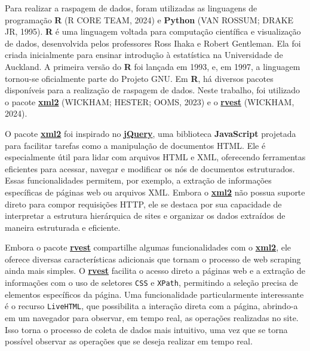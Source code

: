 \documentclass[
  12pt,
  a4paper,
]{scrreprt}
\begin{document}
\vspace{12pt}

Para realizar a raspagem de dados, foram utilizadas as linguagens de
programação \textbf{R} (R CORE TEAM, 2024) e \textbf{Python} (VAN
ROSSUM; DRAKE JR, 1995). \textbf{R} é uma linguagem voltada para
computação científica e visualização de dados, desenvolvida pelos
professores Ross Ihaka e Robert Gentleman. Ela foi criada inicialmente
para ensinar introdução à estatística na Universidade de Auckland. A
primeira versão do \textbf{R} foi lançada em 1993, e, em 1997, a
linguagem tornou-se oficialmente parte do Projeto GNU. Em \textbf{R}, há
diversos pacotes disponíveis para a realização de raspagem de dados.
Neste trabalho, foi utilizado o pacote
\href{https://xml2.r-lib.org/}{\textbf{xml2}} (WICKHAM; HESTER; OOMS,
2023) e o \href{https://rvest.tidyverse.org/}{\textbf{rvest}} (WICKHAM,
2024).

\vspace{12pt}

O pacote \href{https://xml2.r-lib.org/}{\textbf{xml2}} foi inspirado no
\href{https://jquery.com/}{\textbf{jQuery}}, uma biblioteca
\textbf{JavaScript} projetada para facilitar tarefas como a manipulação
de documentos HTML. Ele é especialmente útil para lidar com arquivos
HTML e XML, oferecendo ferramentas eficientes para acessar, navegar e
modificar os nós de documentos estruturados. Essas funcionalidades
permitem, por exemplo, a extração de informações específicas de páginas
web ou arquivos XML. Embora o
\href{https://xml2.r-lib.org/}{\textbf{xml2}} não possua suporte direto
para compor requisições HTTP, ele se destaca por sua capacidade de
interpretar a estrutura hierárquica de sites e organizar os dados
extraídos de maneira estruturada e eficiente.

\vspace{12pt}

Embora o pacote \href{https://rvest.tidyverse.org/}{\textbf{rvest}}
compartilhe algumas funcionalidades com o
\href{https://xml2.r-lib.org/}{\textbf{xml2}}, ele oferece diversas
características adicionais que tornam o processo de web scraping ainda
mais simples. O \href{https://rvest.tidyverse.org/}{\textbf{rvest}}
facilita o acesso direto a páginas web e a extração de informações com o
uso de seletores \texttt{CSS} e \texttt{XPath}, permitindo a seleção
precisa de elementos específicos da página. Uma funcionalidade
particularmente interessante é o recurso \texttt{LiveHTML}, que
possibilita a interação direta com a página, abrindo-a em um navegador
para observar, em tempo real, as operações realizadas no site. Isso
torna o processo de coleta de dados mais intuitivo, uma vez que se torna
possível observar as operações que se deseja realizar em tempo real.
\end{document}
